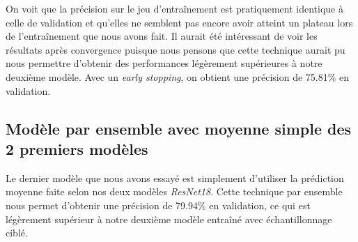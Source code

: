 On voit que la précision sur le jeu d'entraînement est pratiquement identique à celle de validation et qu'elles ne semblent pas encore avoir atteint un plateau lors de l'entraînement que nous avons fait. Il aurait été intéressant de voir les résultats après convergence puisque nous pensons que cette technique aurait pu nous permettre d'obtenir des performances légèrement supérieures à notre deuxième modèle. 
Avec un \emph{early stopping}, on obtient une précision de 75.81\% en validation. 


\subsection{Modèle par ensemble avec moyenne simple des 2 premiers modèles}

Le dernier modèle que nous avons essayé est simplement d'utiliser la prédiction moyenne faite selon nos deux modèles \emph{ResNet18}. 
Cette technique par ensemble nous permet d'obtenir une précision de 79.94\% en validation, ce qui est légèrement supérieur à notre deuxième modèle entraîné avec échantillonnage ciblé. 

